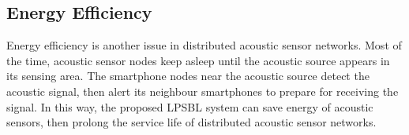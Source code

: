 \subsection{Energy Efficiency}

Energy efficiency is another issue in distributed acoustic sensor networks.
Most of the time, acoustic sensor nodes keep asleep until the acoustic source appears in its sensing area.  
The smartphone nodes near the acoustic source detect the acoustic signal, then alert its neighbour smartphones to prepare for receiving the signal.
In this way, the proposed LPSBL system can save energy of acoustic sensors, then prolong the service life of distributed acoustic sensor networks.







